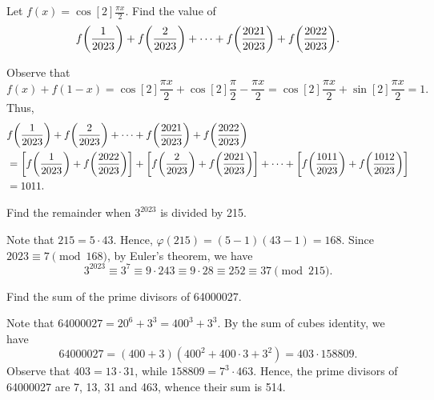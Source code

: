 \clearpage
\begin{question}[1011]\label{Q::2023-S-1-18}
    Let $f(x) = \cos[2]{\frac{\pi x}{2}}$. Find the value of \[f{\left( \frac1{2023} \right)} + f{\left( \frac2{2023} \right)} + \cdots + f{\left( \frac{2021}{2023} \right)} + f{\left( \frac{2022}{2023} \right)}.\]
\end{question}
\begin{solution*}
    Observe that \[f(x) + f(1 - x) = \cos[2]{\frac{\pi x}{2}} + \cos[2]{\frac{\pi}2 - \frac{\pi x}{2}} = \cos[2]{\frac{\pi x}{2}} + \sin[2]{\frac{\pi x}{2}} = 1.\] Thus,
    \begin{align*}
        &f{\left( \frac1{2023} \right)} + f{\left( \frac2{2023} \right)} + \cdots + f{\left( \frac{2021}{2023} \right)} + f{\left( \frac{2022}{2023} \right)}\\
        &= \left[ f{\left( \frac1{2023} \right)} + f{\left( \frac{2022}{2023} \right)} \right] + \left[ f{\left( \frac2{2023} \right)} + f{\left( \frac{2021}{2023} \right)} \right] + \cdots + \left[ f{\left( \frac{1011}{2023} \right)} + f{\left( \frac{1012}{2023} \right)} \right]\\
        &= 1011.
    \end{align*}
\end{solution*}

\begin{question}[37]\label{Q::2023-S-1-19}
    Find the remainder when $3^{2023}$ is divided by 215.
\end{question}
\begin{solution*}
    Note that $215 = 5 \cdot 43$. Hence, $\varphi(215) = (5-1)(43-1) = 168$. Since $2023 \equiv 7 \pmod{168}$, by Euler's theorem, we have \[3^{2023} \equiv 3^7 \equiv 9 \cdot 243 \equiv 9 \cdot 28 \equiv 252 \equiv 37 \pmod{215}.\]
\end{solution*}

\begin{question}[514]\label{Q::2023-S-1-20}
    Find the sum of the prime divisors of 64000027.
\end{question}
\begin{solution*}
    Note that $64000027 = 20^6 + 3^3 = 400^3 + 3^3$. By the sum of cubes identity, we have \[64000027 = (400 + 3)(400^2 + 400 \cdot 3 + 3^2) = 403 \cdot 158809.\] Observe that $403 = 13 \cdot 31$, while $158809 = 7^3 \cdot 463$. Hence, the prime divisors of 64000027 are 7, 13, 31 and 463, whence their sum is 514.
\end{solution*}

